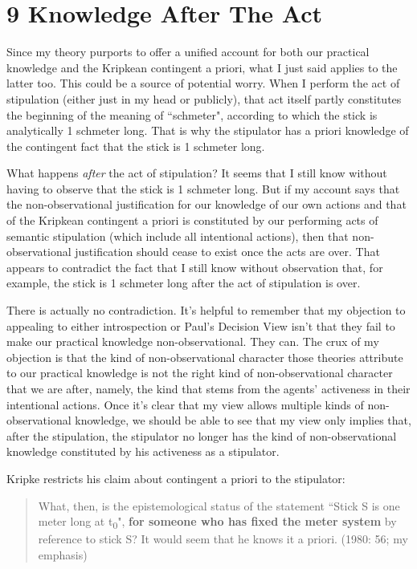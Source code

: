 \documentclass[a4paper,12pt]{article}
\begin{document}
\section*{9 Knowledge After The Act}

Since my theory purports to offer a unified account for both our practical knowledge and the Kripkean contingent a priori, what I just said applies to the latter too. This could be a source of potential worry. When I perform the act of stipulation (either just in my head or publicly), that act itself partly constitutes the beginning of the meaning of ``schmeter", according to which the stick is analytically 1 schmeter long. That is why the stipulator has a priori knowledge of the contingent fact that the stick is 1 schmeter long.

What happens \emph{after} the act of stipulation? It seems that I still know without having to observe that the stick is 1 schmeter long. But if my account says that the non-observational justification for our knowledge of our own actions and that of the Kripkean contingent a priori is constituted by our performing acts of semantic stipulation (which include all intentional actions), then that non-observational justification should cease to exist once the acts are over. That appears to contradict the fact that I still know without observation that, for example, the stick is 1 schmeter long after the act of stipulation is over.

There is actually no contradiction. It's helpful to remember that my objection to appealing to either introspection or Paul's Decision View isn't that they fail to make our practical knowledge non-observational. They can. The crux of my objection is that the kind of non-observational character those theories attribute to our practical knowledge is not the right kind of non-observational character that we are after, namely, the kind that stems from the agents' activeness in their intentional actions. Once it's clear that my view allows multiple kinds of non-observational knowledge, we should be able to see that my view only implies that, after the stipulation, the stipulator no longer has the kind of non-observational knowledge constituted by his activeness as a stipulator.

Kripke restricts his claim about contingent a priori to the stipulator:

\begin{quote} What, then, is the epistemological status of the statement ``Stick S is one meter long at t\textsubscript{0}", \textbf{for someone who has fixed the meter system} by reference to stick S? It would seem that he knows it a priori. (1980: 56; my emphasis) \end{quote}
\end{document}
